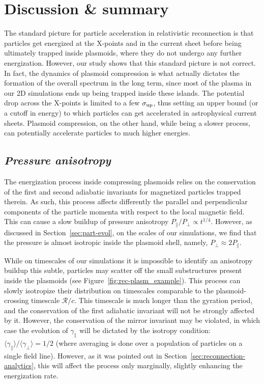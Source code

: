 %
% 
%
% 

\section{Discussion \& summary}
\label{sec:reconnection-discussion}

The standard picture for particle acceleration in relativistic reconnection is that particles get energized at the X-points and in the current sheet before being ultimately trapped inside  plasmoids, where they do not undergo any further energization. However, our study shows that this standard picture is not correct. In fact,  the dynamics of plasmoid compression is what actually dictates the formation of the overall spectrum in the long term, since most of the plasma in our 2D simulations ends up being trapped inside these islands. The potential drop across the X-points is limited to a few $\sigma_{\rm up}$, thus setting an upper bound (or a cutoff in energy) to which particles can get accelerated in astrophysical current sheets. Plasmoid compression, on the other hand, while being a slower process, can potentially accelerate particles to much higher energies.

\subsection*{\small\it Pressure anisotropy}
\label{sec:reconnection-anisotropy}
The energization process inside compressing plasmoids relies on the conservation of the first and second adiabatic invariants for magnetized particles trapped therein. As such, this process affects differently the parallel and perpendicular components of the particle momenta with respect to the local magnetic field. This can cause a slow buildup of pressure anisotropy $P_{\parallel}/P_{\perp} \propto t^{1/4}$. However, as discussed in Section~\ref{sec:part-evol}, on the scales of our simulations, we find that the pressure is almost isotropic inside the plasmoid shell, namely, $P_{\perp}\approx 2P_{\parallel}$. 

While on timescales of our simulations it is impossible to identify an anisotropy buildup this subtle, particles may scatter off the small substructures present inside the plasmoids (see Figure~\ref{fig:rec-plasm_example}). This process can slowly isotropize their distribution on timescales comparable to the plasmoid-crossing timescale $\mathcal{R}/c$. This timescale is much longer than the gyration period, and the conservation of the first adiabatic invariant will not be strongly affected by it. However, the conservation of the mirror invariant may be violated, in which case the evolution of $\gamma_\parallel$ will be dictated by the isotropy condition: $\langle\gamma_\parallel\rangle / \langle\gamma_\perp\rangle = 1/2$ (where averaging is done over a population of particles on a single field line). However, as it was pointed out in Section~\ref{sec:reconnection-analytics}, this will affect the process only marginally, slightly enhancing the energization rate.

